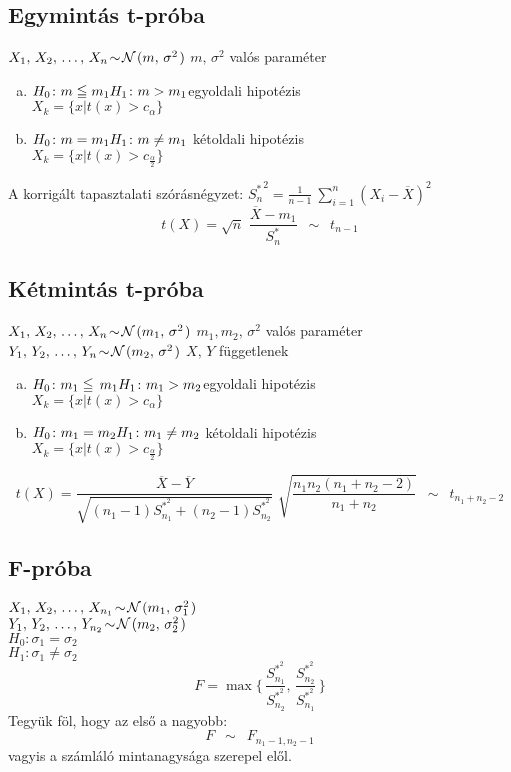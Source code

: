 \documentclass[a4paper,10pt,fleqn]{article}
\newcommand{\N}[2]{\mathcal{N}\hspace{.1em}(#1,\,#2\hspace{.1em})}
\newcommand{\nminta}[4]{#1_1,\,#1_2,\,\ldots,\, #1_{#2} \! \sim \! \N{#3}{#4}}
\newcommand{\eloszlasa}{\enspace \sim \enspace}
\begin{document}
  \subsection*{Egymintás t-próba}
  $\nminta{X}n{m}{\sigma^2}$ \quad $m,\,\sigma^2$ valós paraméter
  \begin{enumerate}[a)]
    \item {$H_0\colon m \leqq m_1\\ H_1\colon m > m_1$\quad egyoldali
    hipotézis\\
    $X_k=\{x|t(x)>c_\alpha\}$}
    \item {$H_0\colon m =  m_1\\ H_1\colon m \ne m_1$ \quad kétoldali
    hipotézis\\
    $X_k=\{x|t(x)>c_\frac{\alpha}2\}$}
  \end{enumerate}
  A korrigált tapasztalati szórásnégyzet: $\displaystyle {S_n^*}^2 = 
  \frac1{n-1}\ \sum_{i=1}^n{(X_i-\overline{\!X})^2}$
  \[ \displaystyle t(X) =
  \sqrt{n}\,\,\dfrac{\overline{\!X}-m_1}{S_n^*}
  \eloszlasa t_{n-1}\]

  \newpage
  
  \subsection*{Kétmintás t-próba}
  $\nminta{X}n{m_1}{\sigma^2}$ \quad $m_1,m_2 ,\,\sigma^2$ valós paraméter\\
  $\nminta{Y}n{m_2}{\sigma^2}$ \quad $X,\,Y$ függetlenek
  \begin{enumerate}[a)]
    \item {$H_0\colon m_1 \leqq \,  m_1\\ H_1\colon m_1 > m_2$\quad egyoldali
    hipotézis\\
    $X_k=\{x|t(x)>c_\alpha\}$}
    \item {$H_0\colon m_1 =  m_2\\ H_1\colon m_1  \ne m_2$ \quad kétoldali
    hipotézis\\
    $X_k=\{x|t(x)>c_\frac{\alpha}2\}$}
  \end{enumerate}
  \[t(X) = \dfrac{\overline{\!X}-\overline{Y}}{\sqrt{(n_1-1) S_{n_1}^{*^2} + 
      (n_2-1) S_{n_2}^{*^2}}}\,\,
  \sqrt{ \dfrac{n _1 n_2 (n_1+n_2 - 2 )}{n_1 + n_2}} \eloszlasa
  t_{n_1+n_2-2}\]
  
  
    
  \subsection*{F-próba}
  $\nminta{X}{n_1}{m_1}{\sigma_1^2}$\\
  $\nminta{Y}{n_2}{m_2}{\sigma_2^2}$\\
  $H_0\colon \sigma_1 = \sigma_2$\\
  $H_1\colon \sigma_1 \neq
  \sigma_2$\\
  \[F = \max\Big\{\, \dfrac{S_{n_1}^{*^2}}{S_{n_2}^{*^2}},\,
  \dfrac{S_{n_2}^{*^2}}{S_{n_1}^{*^2}}\,\Big\}\]
  Tegyük föl, hogy az első a nagyobb:
  \[F \eloszlasa F_{n_1 - 1, n_2 - 1 }\]
  vagyis a számláló mintanagysága szerepel elől.
\end{document}
